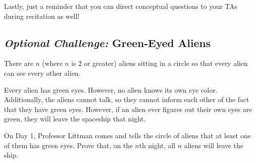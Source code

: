 \documentclass[12pt,letterpaper]{article}
\newif\ifsol
\newcommand{\solu}[2]{ \begin{mdframed} \ifsol #2 \else \vspace{#1} \fi \end{mdframed} }
\begin{document}
Lastly, just a reminder that you can direct conceptual questions to your TAs during recitation as well!
\newpage

\subsection*{\textit{Optional Challenge:} Green-Eyed Aliens}

There are $n$ (where $n$ is 2 or greater) aliens sitting in a circle so that every alien can see every other alien.

Every alien has green eyes. However, no alien knows its own eye color. Additionally, the aliens cannot talk, so they cannot inform each other of the fact that they have green eyes. However, if an alien ever figures out their own eyes are green, they will leave the spaceship that night.

On Day 1, Professor Littman comes and tells the circle of aliens that at least one of them has green eyes. Prove that, on the $n$th night, all $n$ aliens will leave the ship. 

\solu{6cm}{Let $P(n)$ be the predicate that $n$ aliens will leave on the $n$th night.

\textbf{Base Case:} If there are 2 aliens, then it takes them two nights to figure out they both have green eyes. To arrive at this conclusion, consider one of the aliens, $D$. On the first day, $D$ sees that the other alien, $D'$ has green eyes. $D'$ does not know that $D'$ has green eyes, but they see that $D$ does. Hence, neither $D$ nor $D'$ realizes on the first day that they themselves have green eyes. On the second day though, $D$ sees that the other alien, $D'$, did NOT realize that $D'$ has green eyes. $D'$ would have come to this conclusion if $D'$ could see $D$'s eyes were not green given Professor Littman's claim that at least one of them has green eyes. Hence, $D$ knows that $D$ has green eyes! $D'$ also knows that $D'$ has green eyes by the same reasoning! (These aliens are strong at logic.) So, on the second night, they both leave. Thus, $P(2)$ is true.

\textbf{Inductive Hypothesis:} Now, for some arbitrary integer $k \geq 2$, assume $P(k)$. That is, it takes $k$ nights for $k$ aliens to leave.

\textbf{Inductive Step:} Consider the case where there are $k+1$ aliens and consider what one individual alien is thinking. This one alien sees $k$ aliens with green eyes. Therefore, if this alien does not have green eyes, they would expect the other aliens to leave after $k$ nights since they can see them, by the IH. Since they don't, this alien realizes that their eyes are also green and leaves on night $k+1$. Thus, $P(k+1)$ is true.

\textbf{Conclusion:} As $P(2)$ is true and, for any integer $k \geq 2$ $P(k)$ implies $P(k+1)$, $P(n)$ holds for all integers $n \geq 2$.}
\end{document}
